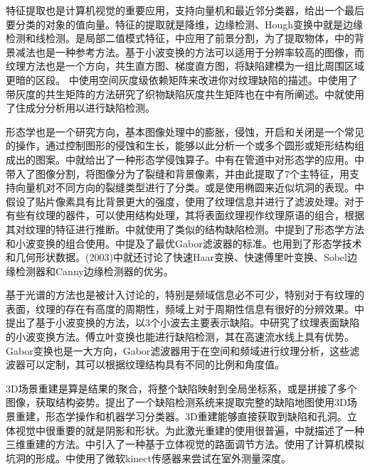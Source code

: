 特征提取也是计算机视觉的重要应用，支持向量机和最近邻分类器，给出一个最后要分类的对象的值向量。特征的提取就是降维，边缘检测、Hough变换中就是边缘检测和线检测。\cite{SONG2013858}是局部二值模式特征，\cite{doi:10106108873801}中应用了前景分割，为了提取物体，\cite{Guo2009}中的背景减法也是一种参考方法。基于小波变换的方法可以适用于分辨率较高的图像，而纹理方法也是一个方向，共生直方图、梯度直方图，将缺陷建模为一组比周围区域更暗的区段。 \cite{647318}中使用空间灰度级依赖矩阵来改进你对纹理缺陷的描述。\cite{LATIFAMET2000543}中使用了带灰度的共生矩阵的方法研究了织物缺陷灰度共生矩阵也在\cite{Chondronasios2016}中有所阐述。\cite{BISSI2013838}中就使用了住成分分析用以进行缺陷检测。

形态学也是一个研究方向，基本图像处理中的膨胀，侵蚀，开启和关闭是一个常见的操作，通过控制图形的侵蚀和生长，能够以此分析一个或多个圆形或矩形结构组成出的图案。\cite{Shahin1997}中就给出了一种形态学侵蚀算子。\cite{SINHA200647}中有在管道中对形态学的应用。\cite{Moussa2011}中带入了图像分割，将图像分为了裂缝和背景像素，并由此提取了7个主特征，用支持向量机对不同方向的裂缝类型进行了分类。或是使用椭圆来近似坑洞的表现。\cite{Radopoulou2014}中假设了贴片像素具有比背景更大的强度，使用了纹理信息并进行了滤波处理。对于有些有纹理的器件，可以使用结构处理，其将表面纹理视作纹理原语的组合，根据其对纹理的特征进行推断。\cite{ABOUELELA20051435}中就使用了类似的结构缺陷检测。\cite{6287161}中提到了形态学方法和小波变换的组合使用。\cite{7334956}中提及了最优Gabor滤波器的标准。\cite{Halimi2012}也用到了形态学技术和几何形状数据。(2003)中就还讨论了快速Haar变换、快速傅里叶变换、Sobel边缘检测器和Canny边缘检测器的优劣。

基于光谱的方法也是被计入讨论的，特别是频域信息必不可少，特别对于有纹理的表面，纹理的存在有高度的周期性，频域上对于周期性信息有很好的分辨效果。\cite{TABASSIAN20115259}中提出了基于小波变换的方法，以3个小波去主要表示缺陷。\cite{6720367}中研究了纹理表面缺陷的小波变换方法。傅立叶变换也能进行缺陷检测，其在高速流水线上具有优势。Gabor变换也是一大方向，Gabor滤波器用于在空间和频域进行纹理分析，这些滤波器可以定制，其可以根据纹理结构具有不同的比例和角度值。

3D场景重建是算是结果的聚合，将整个缺陷映射到全局坐标系，或是拼接了多个图像，获取结构姿势。\cite{Jahanshahi2013}提出了一个缺陷检测系统来提取完整​​的缺陷地图使用3D场景重建，形态学操作和机器学习分类器。3D重建能够直接获取到缺陷和孔洞。立体视觉中很重要的就是阴影和形状。为此激光重建的使用很普遍，\cite{1232300}中就描述了一种三维重建的方法。\cite{Li2009}中引入了一种基于立体视觉的路面调节方法。\cite{Karuppuswamy2000}使用了计算机模拟坑洞的形成。\cite{doi:10106119435487}中使用了微软kinect传感器来尝试在室外测量深度。

